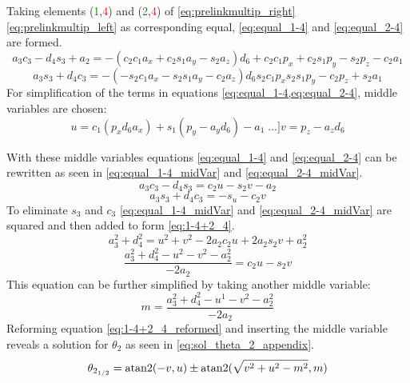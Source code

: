 Taking elements (\textcolor{green}{1},\textcolor{red}{4}) and (\textcolor{green}{2},\textcolor{red}{4}) of \ref{eq:prelinkmultip_right} \ref{eq:prelinkmultip_left} as corresponding equal,  \ref{eq:equal_1-4} and \ref{eq:equal_2-4} are formed.
\begin{equation}\label{eq:equal_1-4}
a_3 c_3 - d_4 s_3 + a_2 = - (c_2 c_1 a_x + c_2 s_1 a_y -s_2 a_z)d_6 + c_2 c_1 p_x + c_2 s_1 p_y -s_2 p_z -c_2 a_1
\end{equation}
\begin{equation}\label{eq:equal_2-4}
a_3 s_3 +d_4 c_3 = - (- s_2 c_1 a_x - s_2 s_1 a_y - c_2 a_z)d_6 s_2 c_1 p_x s_2 s_1 p_y  -c_2 p_z +s_2 a_1
\end{equation}
For simplification of the terms in equations \cref{eq:equal_1-4,eq:equal_2-4}, middle variables are chosen:
\begin{equation}
u=c_1 (p_x d_6 a_x ) + s_1 (p_y -a_y d_6)-a_1 \phantom[...]
v= p_z - a_z d_6
\end{equation}

With these middle variables equations \ref{eq:equal_1-4} and \ref{eq:equal_2-4} can be rewritten as seen in \ref{eq:equal_1-4_midVar} and \ref{eq:equal_2-4_midVar}.
\begin{equation}\label{eq:equal_1-4_midVar}
a_3 c_3 - d_4 s_3 = c_2 u -s_2 v -a_2 
\end{equation}
\begin{equation}\label{eq:equal_2-4_midVar}
a_3 s_3 + d_4 c_3 = - s_ u - c_2 v
\end{equation}
To eliminate $s_3$ and $c_3$ \ref{eq:equal_1-4_midVar} and \ref{eq:equal_2-4_midVar} are squared and then added to form \ref{eq:1-4+2_4}.
\begin{equation}\label{eq:1-4+2_4}
a_3^2 +d_4^2 = u^2 +v^2 - 2a_2 c_2 u + 2a_2 s_2 v +a_2^2
\end{equation}
\begin{equation}\label{eq:1-4+2_4_reformed}
\frac{a_3^2 + d_4^2 - u^2 - v^2 -a_2^2}{-2a_2}= c_2 u -s_2 v
\end{equation}
This equation can be further simplified by taking another middle variable:
\begin{equation*}
m = \frac{a_3^2 +d_4^2 - u^1 -v^2 - a_2^2}{-2a_2}
\end{equation*}
Reforming equation \ref{eq:1-4+2_4_reformed} and inserting the middle variable reveals a solution for $\theta_2$ as seen in \ref{eq:sol_theta_2_appendix}.
\begin{equation}\label{eq:sol_theta_2_appendix}
\theta_{2_{1/2}} = \operatorname{atan2} (-v , u)\pm \operatorname{atan2}(\sqrt{v^2 +u^2 - m^2 } , m)
\end{equation}



